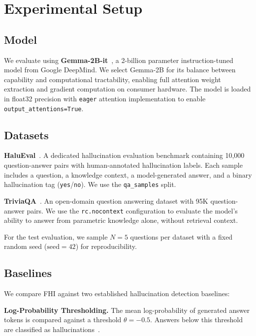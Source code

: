 \section{Experimental Setup}
\label{sec:experiments}

\subsection{Model}

We evaluate using \textbf{Gemma-2B-it}~\cite{team2024gemma}, a 2-billion parameter instruction-tuned model from Google DeepMind. We select Gemma-2B for its balance between capability and computational tractability, enabling full attention weight extraction and gradient computation on consumer hardware. The model is loaded in float32 precision with \texttt{eager} attention implementation to enable \texttt{output\_attentions=True}.

\subsection{Datasets}

\textbf{HaluEval}~\cite{li2023halueval}. A dedicated hallucination evaluation benchmark containing 10,000 question-answer pairs with human-annotated hallucination labels. Each sample includes a question, a knowledge context, a model-generated answer, and a binary hallucination tag (\texttt{yes}/\texttt{no}). We use the \texttt{qa\_samples} split.

\textbf{TriviaQA}~\cite{joshi2017triviaqa}. An open-domain question answering dataset with 95K question-answer pairs. We use the \texttt{rc.nocontext} configuration to evaluate the model's ability to answer from parametric knowledge alone, without retrieval context.

For the test evaluation, we sample $N=5$ questions per dataset with a fixed random seed ($\text{seed}=42$) for reproducibility.

\subsection{Baselines}

We compare FHI against two established hallucination detection baselines:

\textbf{Log-Probability Thresholding.} The mean log-probability of generated answer tokens is compared against a threshold $\theta = -0.5$. Answers below this threshold are classified as hallucinations~\cite{kadavath2022language}.

